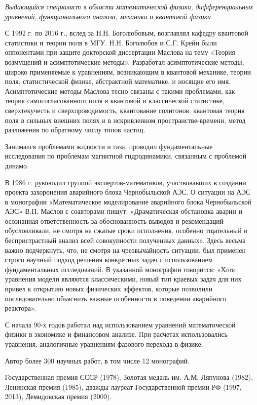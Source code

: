 {\it Выдающийся специалист в области математической физики, дифференциальных уравнений, функционального анализа, механики и квантовой физики.

С 1992 г. по 2016 г., вслед за Н.Н. Боголюбовым, возглавлял кафедру квантовой статистики и теории поля в МГУ.  Н.Н. Боголюбов и С.Г. Крейн были оппонентами при защите докторской диссертации Маслова на тему «Теория возмущений и асимптотические методы». Разработал асимптотические методы, широко применяемые к уравнениям, возникающим в квантовой механике, теории поля, статистической физике, абстрактной математике, и носящие его имя. Асимптотические методы Маслова тесно связаны с такими проблемами, как теория самосогласованного поля в квантовой и классической статистике, сверхтекучесть и сверхпроводимость, квантование солитонов, квантовая теория поля в сильных внешних полях и в искривленном пространстве-времени, метод разложения по обратному числу типов частиц.

Занимался проблемами жидкости и газа, проводил фундаментальные исследования по проблемам магнитной гидродинамики, связанным с проблемой динамо.

В 1986 г. руководил группой экспертов-математиков, участвовавших в создании проекта захоронения аварийного блока Чернобыльской АЭС. О ситуации на АЭС в монографии «Математическое моделирование аварийного блока Чернобыльской АЭС» В.П. Маслов с соавторами пишут: «Драматическая обстановка аварии и осознанная ответственность за обоснованность выводов и рекомендаций обусловливали, не смотря на сжатые сроки исполнения, особенно тщательный и беспристрастный анализ всей совокупности полученных данных». Здесь весьма важно подчеркнуть, что, не смотря на чрезвычайность ситуации, был применен строго научный подход решения конкретных задач с использованием фундаментальных исследований.  В указанной монографии говорится: «Хотя уравнения модели являются классическими, новый тип краевых задач для них привел к открытию новых физических эффектов, которые позволили последовательно объяснить важные особенности в поведении аварийного реактора».

С начала 90-х годов работал над использованием уравнений математической физики в экономике и финансовом анализе. При расчетах использовались уравнения, аналогичные уравнениям фазового перехода в физике.

Автор более 300 научных работ, в том числе 12 монографий.

Государственная премия СССР (1978), Золотая медаль им. А.М. Ляпунова (1982), Ленинская премия (1985), дважды лауреат Государственной премии РФ (1997, 2013), Демидовская премия (2000).}

